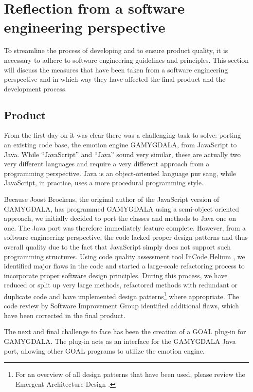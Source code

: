 \section{Reflection from a software engineering perspective}
To streamline the process of developing and to ensure product quality, it is necessary to adhere to software engineering guidelines and principles. This section will discuss the measures that have been taken from a software engineering perspective and in which way they have affected the final product and the development process.


\subsection{Product}
From the first day on it was clear there was a challenging task to solve: porting an existing code base, the emotion engine GAMYGDALA, from JavaScript to Java. While ``JavaScript'' and ``Java'' sound very similar, these are actually two very different languages and require a very different approach from a programming perspective. Java is an object-oriented language pur sang, while JavaScript, in practice, uses a more procedural programming style.

Because Joost Broekens, the original author of the JavaScript version of GAMYGDALA, has programmed GAMYGDALA using a semi-object oriented approach, we initially decided to port the classes and methods to Java one on one. The Java port was therefore immediately feature complete. However, from a software engineering perspective, the code lacked proper design patterns and thus overall quality due to the fact that JavaScript simply does not support such  programming structures. Using code quality assessment tool InCode Helium \citep{incode}, we identified major flaws in the code and started a large-scale refactoring process to incorporate proper software design principles. During this process, we have reduced or split up very large methods, refactored methods with redundant or duplicate code and have implemented design patterns\footnote{For an overview of all design patterns that have been used, please review the Emergent Architecture Design \citep{ead}.} where appropriate. The code review by Software Improvement Group \citep{SIG} identified additional flaws, which have been corrected in the final product.

The next and final challenge to face has been the creation of a GOAL \citep{goal} plug-in for GAMYGDALA. The plug-in acts as an interface for the GAMYGDALA Java port, allowing other GOAL programs to utilize the emotion engine.

